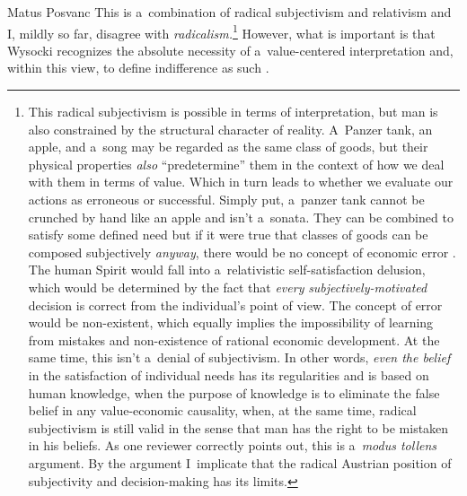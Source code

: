 \begin{artengenv}{Matus Posvanc}
This is a~combination of radical subjectivism and relativism and I, mildly so far, disagree with \textit{radicalism.}\footnote{This radical subjectivism is possible in terms of interpretation, but man is also constrained by the structural character of reality. A~Panzer tank, an apple, and a~song may be regarded as the same class of goods, but their physical properties \textit{also} ``predetermine'' them in the context of how we deal with them in terms of value. Which in turn leads to whether we evaluate our actions as erroneous or successful. Simply put, a~panzer tank cannot be crunched by hand like an apple and isn't a~sonata. They can be combined to satisfy some defined need but if it were true that classes of goods can be composed subjectively \textit{anyway}, there would be no concept of economic error 
\parencite[see][]{Posvanc2021Evolutionary}. %
 The human Spirit would fall into a~relativistic self-satisfaction delusion, which would be determined by the fact that \textit{every} \textit{subjectively-motivated} decision is correct from the individual's point of view. The concept of error would be non-existent, which equally implies the impossibility of learning from mistakes and non-existence of rational economic development. At the same time, this isn't a~denial of subjectivism. In other words, \textit{even the belief} in the satisfaction of individual needs has its regularities and is based on human knowledge, when the purpose of knowledge is to eliminate the false belief in any value-economic causality, when, at the same time, radical subjectivism is still valid in the sense that man has the right to be mistaken in his beliefs. As one reviewer correctly points out, this is a~\textit{modus tollens} argument. By the argument I~implicate that the radical Austrian position of subjectivity and decision-making has its limits. } However, what is important is that Wysocki recognizes the absolute necessity of a~value-centered interpretation and, within this view, to define indifference as such 
\parencite[see also][]{Machaj2007praxeological}.%





\end{artengenv}
